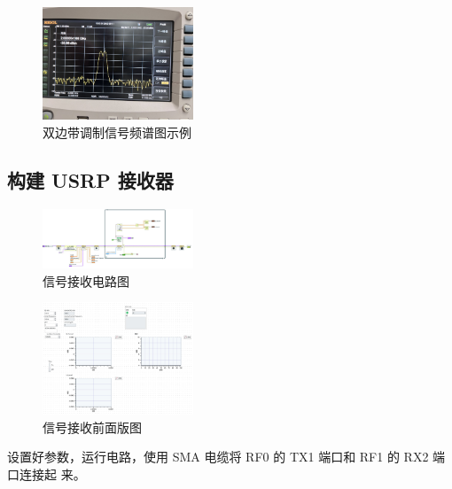\documentclass{../source/Experiment}
\begin{document}
\begin{figure}[H]
    \centering
    \includegraphics[width = 0.4\textwidth,angle=180]{lab9/7.jpg}
    \caption{双边带调制信号频谱图示例}
\end{figure}

\subsection{构建 USRP 接收器}
\begin{figure}[H]
    \centering
    \includegraphics[width = 0.4\textwidth]{lab9/Rx-a.jpg}
    \caption{信号接收电路图}
\end{figure}
\begin{figure}[H]
    \centering
    \includegraphics[width = 0.4\textwidth]{lab9/Rx-b.jpg}
    \caption{信号接收前面版图}
\end{figure}

设置好参数，运行电路，使用 SMA 电缆将 RF0 的 TX1 端口和 RF1 的 RX2 端口连接起 来。
\end{document}
